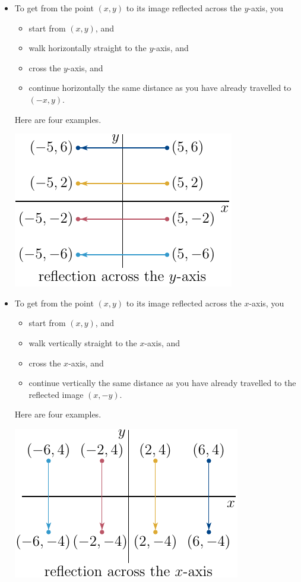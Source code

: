\begin{itemize}
\item
 To get from the
     point $(x,y)$ to its image reflected across the $y$-axis, you
     \begin{itemize}
       \item start from $(x,y)$, and
       \item walk horizontally straight to the $y$-axis, and
       \item cross the $y$-axis, and
       \item continue horizontally the same distance as you have 
                  already travelled to $(-x,y)$. 
     \end{itemize}
     Here are four examples.
    \begin{efig}
    \begin{center}
        \includegraphics{refl2dX.pdf}
    \end{center}
    \end{efig}
\item
 To get from the
     point $(x,y)$ to its image reflected across the $x$-axis, you
     \begin{itemize}
       \item start from $(x,y)$, and
       \item walk vertically straight to the $x$-axis, and
       \item cross the $x$-axis, and
       \item continue vertically the same distance as you have 
                  already travelled to the reflected image $(x,-y)$. 
     \end{itemize}
     Here are four examples.
    \begin{efig}
    \begin{center}
        \includegraphics{refl2dY.pdf}

\end{center}
\end{efig}
\end{itemize}
